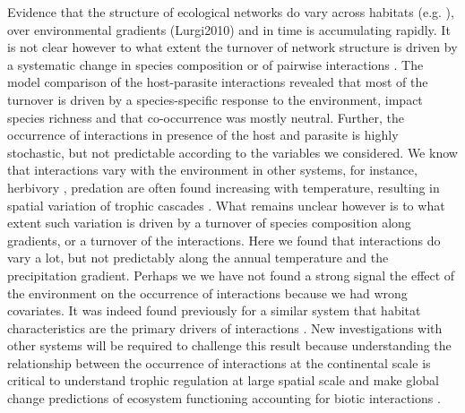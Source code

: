 \documentclass[12pt]{article}
\begin{document}
Evidence that the structure of ecological networks do vary across habitats
(e.g. \citealt{Tylianakis2007, Plein2012}), over environmental gradients (Lurgi2010) and
in time \citep{Trolsgaard2015} is accumulating rapidly. It is not clear however to
what extent the turnover of network structure is driven by a systematic change
in species composition or of pairwise interactions \citep{Poisot2012, Poisot2015a}.
The model comparison of the host-parasite interactions revealed that most of
the turnover is driven by a species-specific response to the environment,
impact species richness and that co-occurrence was mostly neutral. Further,
the occurrence of interactions in presence of the host and parasite is highly
stochastic, but not predictable according to the variables we considered. We
know that interactions vary with the environment in other systems, for
instance, herbivory \citep{Shurin2012}, predation \citep{McKinnon2010,
Legagneux2014} are often found increasing with temperature, resulting in
spatial variation of trophic cascades \citep{(Gray2016}. What remains unclear
however is to what extent such variation is driven by a turnover of species
composition along gradients, or a turnover of the interactions. Here we found
that interactions do vary a lot, but not predictably along the annual
temperature and the precipitation gradient. Perhaps we we have not found a
strong signal  the effect of the environment on the occurrence of interactions
because we had wrong covariates. It was indeed found previously for a similar
system that habitat characteristics are the primary drivers of interactions
\citep{Nyman2015}. New investigations with other systems will be required to
challenge this result because understanding the relationship between the
occurrence of interactions at the continental scale is critical to understand
trophic regulation at large spatial scale and make global change predictions
of ecosystem functioning accounting for biotic interactions \citep{Harfoot2013}.
\end{document}
